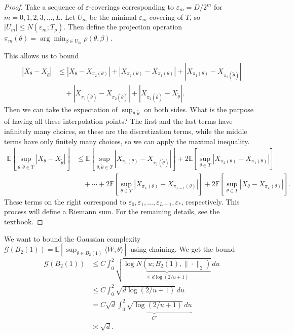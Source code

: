 \begin{proof}
Take a sequence of $\varepsilon$-coverings corresponding to $\varepsilon_m = D/2^m$ for $m = 0, 1, 2, 3, \ldots, L$. Let $U_m$ be the minimal $\varepsilon_m$-covering of $T$, so $|U_m| \leq N(\varepsilon_m; T_\rho)$. Then define the projection operation $\pi_m(\theta) = \arg\min_{\beta \in U_m} \rho(\theta, \beta)$.

This allows us to bound
\begin{align*}
|X_\theta - X_{\widetilde{\theta}}| &\leq |X_\theta - X_{\pi_2(\theta)}| + |X_{\pi_2(\theta)} - X_{\pi_1(\theta)}| + |X_{\pi_1(\theta)} - X_{\pi_1(\widetilde{\theta})}| \\
&\quad + |X_{\pi_1(\widetilde{\theta})} - X_{\pi_2(\widetilde{\theta})}| + |X_{\pi_2(\widetilde{\theta})} - X_{\widetilde{\theta}}|.
\end{align*}
Then we can take the expectation of $\sup_{\theta, \widetilde{\theta}}$ on both sides. What is the purpose of having all these interpolation points? The first and the last terms have infinitely many choices, so these are the discretization terms, while the middle terms have only finitely many choices, so we can apply the maximal inequality.
\begin{align*}
\mathbb{E}\left[\sup_{\theta, \widetilde{\theta} \in T} |X_\theta - X_{\widetilde{\theta}}|\right] &\leq \mathbb{E}\left[\sup_{\theta, \widetilde{\theta} \in T} |X_{\pi_1(\theta)} - X_{\pi_1(\widetilde{\theta})}|\right] + 2\mathbb{E}\left[\sup_{\theta \in T} |X_{\pi_2(\theta)} - X_{\pi_1(\theta)}|\right] \\
&\quad + \cdots + 2\mathbb{E}\left[\sup_{\theta \in T} |X_{\pi_L(\theta)} - X_{\pi_{L-1}(\theta)}|\right] + 2\mathbb{E}\left[\sup_{\theta \in T} |X_\theta - X_{\pi_L(\theta)}|\right].
\end{align*}
These terms on the right correspond to $\varepsilon_0, \varepsilon_1, \ldots, \varepsilon_{L-1}, \varepsilon_*$, respectively. This process will define a Riemann sum. For the remaining details, see the textbook.
\end{proof}

\begin{exam}
We want to bound the Gaussian complexity $\mathcal{G}(B_2(1)) = \mathbb{E}[\sup_{\theta \in B_2(1)} \langle W, \theta \rangle]$ using chaining. We get the bound
\begin{align*}
\mathcal{G}(B_2(1)) &\leq C \int_0^2 \sqrt{\underbrace{\log N(u; B_2(1), \|\cdot\|_2)}_{\leq d \log(2/u + 1)}} \, du \\
&\leq C \int_0^2 \sqrt{d \log(2/u + 1)} \, du \\
&= C \sqrt{d} \underbrace{\int_0^2 \sqrt{\log(2/u + 1)} \, du}_{C'} \\
&\asymp \sqrt{d}.
\end{align*}
\end{exam}

